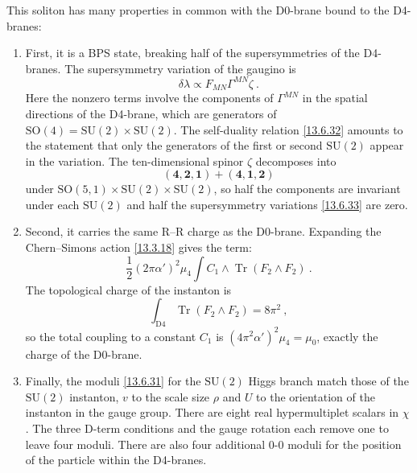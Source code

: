 This soliton has many properties in common with the D0-brane bound to the D4-branes:
\begin{enumerate}
	\item First, it is a BPS state, breaking half of the supersymmetries of the D4-branes. The supersymmetry variation of the gaugino is
	\begin{equation}
		\delta\lambda \propto F_{MN}\Gamma^{MN}\zeta \:. \label{13.6.33}
	\end{equation}
	Here the nonzero terms involve the components of $\Gamma^{MN}$ in the spatial directions of the D4-brane, which are generators of $\mathrm{SO}(4) = \mathrm{SU}(2)\times\mathrm{SU}(2)$. The self-duality relation \eqref{13.6.32} amounts to the statement that only the generators of the first or second $\mathrm{SU}(2)$ appear in the variation. The ten-dimensional spinor $\zeta$ decomposes into
	\begin{equation}
		(\mathbf{4}, \mathbf{2}, \mathbf{1}) + (\mathbf{4}, \mathbf{1}, \mathbf{2}) \label{13.6.34}
	\end{equation}
	under $\mathrm{SO}(5,1)\times\mathrm{SU}(2)\times\mathrm{SU}(2)$, so half the components are invariant under each $\mathrm{SU}(2)$ and half the supersymmetry variations \eqref{13.6.33} are zero.
	
	\item Second, it carries the same R--R charge as the D0-brane. Expanding the Chern--Simons action \eqref{13.3.18} gives the term:
	\begin{equation}
		\frac{1}{2}(2\pi\alpha')^2\mu_4\int C_{\textit{1}}\wedge \operatorname{Tr}(F_{\textit{2}}\wedge F_{\textit{2}}) \:. \label{13.6.35}
	\end{equation}
	The topological charge of the instanton is
	\begin{equation}
		\int_{\mathrm{D}4}\operatorname{Tr}(F_{\textit{2}}\wedge F_{\textit{2}}) = 8\pi^2 \:, \label{13.6.36}
	\end{equation}
	so the total coupling to a constant $C_{\textit{1}}$ is $(4\pi^2\alpha')^2\mu_4 = \mu_0$, exactly the charge of the D0-brane.
	
	\item Finally, the moduli \eqref{13.6.31} for the $\mathrm{SU}(2)$ Higgs branch match those of the $\mathrm{SU}(2)$ instanton, $v$ to the scale size $\rho$ and $U$ to the orientation of the instanton in the gauge group. There are eight real hypermultiplet scalars in $\chi$. The three D-term conditions and the gauge rotation each remove one to leave four moduli. There are also four additional 0-0 moduli for the position of the particle within the D4-branes.
\end{enumerate}
